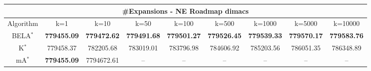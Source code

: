 \begin{tabular}{c|cccccccc}\toprule
\multicolumn{9}{c}{#Expansions - NE Roadmap dimacs}\\ \midrule
Algorithm & k=1 & k=10 & k=50 & k=100 & k=500 & k=1000 & k=5000 & k=10000 \\ \midrule
BELA$^*$ & \textbf{779455.09} & \textbf{779472.62} & \textbf{779491.68} & \textbf{779501.27} & \textbf{779526.45} & \textbf{779539.33} & \textbf{779570.17} & \textbf{779583.76} \\
K$^*$ & 779458.37 & 782205.68 & 783019.01 & 783796.98 & 784606.92 & 785203.56 & 786051.35 & 786348.89 \\
mA$^*$ & \textbf{779455.09} & 7794672.61 & -- & -- & -- & -- & -- & -- \\ \bottomrule 
\end{tabular}

